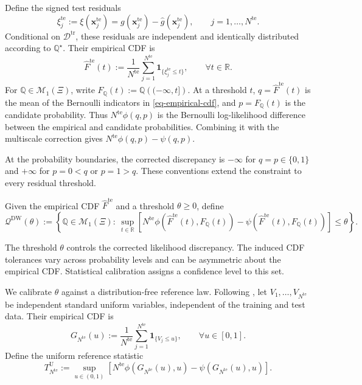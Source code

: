 \documentclass[review,11pt,3p,authoryear,nopreprintline]{elsarticle}
\begin{document}
Define the signed test residuals
\[
  \xi_j^{\mathrm{te}}:=\xi(\bm x_j^{\mathrm{te}})=g(\bm x_j^{\mathrm{te}})-\hat g(\bm x_j^{\mathrm{te}}),\qquad j=1,\ldots,N^{\mathrm{te}}.
\]
Conditional on $\mathcal D^{\mathrm{tr}}$, these residuals are independent and identically distributed according to $\mathbb Q^\star$. Their empirical CDF is
\begin{equation}
  \widehat F^{\mathrm{te}}(t):=\frac{1}{N^{\mathrm{te}}}\sum_{j=1}^{N^{\mathrm{te}}}\mathbf 1_{\{\xi_j^{\mathrm{te}}\le t\}},\qquad \forall t\in\mathbb R.
  \label{eq-empirical-cdf}
\end{equation}
For $\mathbb Q\in\mathcal M_1(\Xi)$, write $F_{\mathbb Q}(t):=\mathbb Q\left(({-\infty},t]\right)$. At a threshold $t$, $q=\widehat F^{\mathrm{te}}(t)$ is the mean of the Bernoulli indicators in \eqref{eq-empirical-cdf}, and $p=F_{\mathbb Q}(t)$ is the candidate probability. Thus $N^{\mathrm{te}}\phi(q,p)$ is the Bernoulli log-likelihood difference between the empirical and candidate probabilities. Combining it with the multiscale correction gives $N^{\mathrm{te}}\phi(q,p)-\psi(q,p)$.

At the probability boundaries, the corrected discrepancy is $-\infty$ for $q=p\in\{0,1\}$ and $+\infty$ for $p=0<q$ or $p=1>q$. These conventions extend the constraint to every residual threshold.

\begin{definition}
  \label{definition-dw-ambiguity-set}
  Given the empirical CDF $\widehat F^{\mathrm{te}}$ and a threshold $\theta\ge0$, define
  \begin{equation} 
    \label{eq-cdf-ambiguity-set}
      \mathcal Q^{\mathrm{DW}}(\theta):=\left\{\mathbb Q\in\mathcal M_1(\Xi):\ 
      \sup_{t\in\mathbb R}\left[ N^{\mathrm{te}}\phi\!\left(\widehat F^{\mathrm{te}}(t),F_{\mathbb Q}(t)\right) 
       {}-\psi\!\left(\widehat F^{\mathrm{te}}(t),F_{\mathbb Q}(t)\right)\right]\le\theta\right\}. 
  \end{equation} 
\end{definition}

The threshold $\theta$ controls the corrected likelihood discrepancy. The induced CDF tolerances vary across probability levels and can be asymmetric about the empirical CDF. Statistical calibration assigns a confidence level to this set.

We calibrate $\theta$ against a distribution-free reference law. Following \citet{L.J23}, let $V_1,\ldots,V_{N^{\mathrm{te}}}$ be independent standard uniform variables, independent of the training and test data. Their empirical CDF is
\begin{equation*}
  G_{N^{\mathrm{te}}}(u):=\frac{1}{N^{\mathrm{te}}}\sum_{j=1}^{N^{\mathrm{te}}}\mathbf 1_{\{V_j\le u\}},\qquad \forall u\in[0,1].
\end{equation*}
Define the uniform reference statistic
\begin{equation}
  T_{N^{\mathrm{te}}}^{\mathrm U}:=\sup_{u\in(0,1)}\left[N^{\mathrm{te}}\phi\!\left(G_{N^{\mathrm{te}}}(u),u\right)-\psi\!\left(G_{N^{\mathrm{te}}}(u),u\right)\right].
  \label{eq-dw-reference-statistic}
\end{equation}
\end{document}
